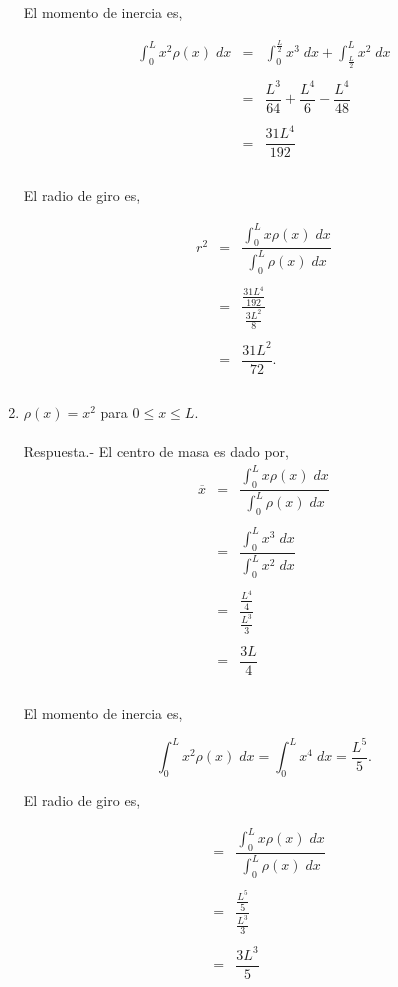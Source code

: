 \begin{enumerate}[\bfseries 1.]
    El momento de inercia es,

    $$\begin{array}{rcl}
	\displaystyle\int_0^Lx^2\rho(x)\; dx&=&\displaystyle\int_0^{\frac{L}{2}}x^3\; dx + \int_{\frac{L}{2}}^L x^2\; dx\\\\
					    &=&\dfrac{L^3}{64}+\dfrac{L^4}{6}-\dfrac{L^4}{48}\\\\
					    &=&\dfrac{31L^4}{192}\\\\
    \end{array}$$

    El radio de giro es,

    $$\begin{array}{rcl}
	r^2&=&\dfrac{\int_0^L x\rho(x)\; dx}{\int_0^L \rho(x)\; dx}\\\\
	   &=&\dfrac{\frac{31L^4}{192}}{\frac{3L^2}{8}}\\\\
	   &=&\dfrac{31L^2}{72}.\\\\
    \end{array}$$

\item $\rho(x) = x^2$ para $0\leq x\leq L.$\\\\
    Respuesta.-\; El centro de masa es dado por,
    $$\begin{array}{rcl}
	\overline{x}&=&\dfrac{\int_0^L x\rho(x)\; dx}{\int_0^L \rho(x)\; dx}\\\\
		    &=&\dfrac{\int_0^L x^3\; dx}{\int_0^L x^2\; dx}\\\\
		    &=&\dfrac{\frac{L^4}{4}}{\frac{L^3}{3}}\\\\
		    &=&\dfrac{3L}{4}\\\\
    \end{array}$$

    El momento de inercia es,

    $$\int_0^L x^2 \rho(x)\; dx = \int_0^L x^4\; dx = \dfrac{L^5}{5}.$$

    El radio de giro es,

    $$\begin{array}{rcl}
	&=&\dfrac{\int_0^L x\rho(x)\; dx}{\int_0^L \rho(x)\; dx}\\\\
	&=&\dfrac{\frac{L^5}{5}}{\frac{L^3}{3}}\\\\
	&=&\dfrac{3L^3}{5}\\\\
    \end{array}$$


\end{enumerate}
